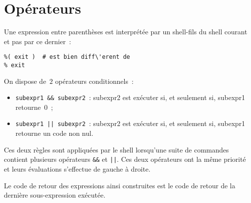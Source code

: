 \section{Op\'erateurs}%
\begin{frame}[fragile]
  Une expression entre parenth\`eses est interpr\'et\'ee par un
  shell-fils du shell courant et pas par ce dernier~:
\begin{verbatim}
%( exit )  # est bien diff\'erent de
% exit 
\end{verbatim}
    On dispose de~$2$ op\'erateurs conditionnels~:
    \begin{itemize}
    \item[] \verb?subexpr1 && subexpr2?~: subexpr2 est ex\'ecuter si,
      et seulement si, subexpr1 retourne~0~;
    \item[] \verb?subexpr1 || subexpr2?~: subexpr2 est ex\'ecuter si,
      et seulement si, subexpr1 retourne un code non nul.
    \end{itemize}
  Ces deux r\`egles sont appliqu\'ees par le shell lorsqu'une suite de
  commandes contient plusieurs op\'erateurs \verb+&&+ et \verb+||+.
  Ces deux op\'erateurs ont la m\^eme priorit\'e et leurs
  \'evaluations s'effectue de gauche \`a droite.
  \par\medskip
  Le code de retour des expressions ainsi construites est le code de
  retour de la derni\`ere sous-expression ex\'ecut\'ee.
\end{frame}
